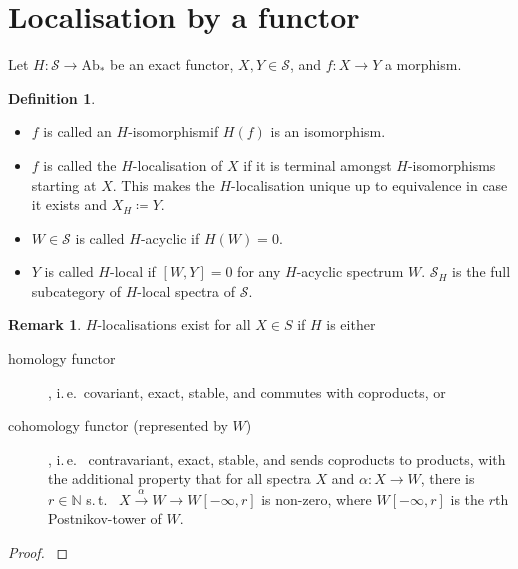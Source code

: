 \documentclass[english]{scrartcl}
\theoremstyle{definition}
\newtheorem*{Def}{Definition}
\newtheorem*{Rem}{Remark}
\theoremstyle{remark}
\newcommand*{\idest}{i.\,e.\ }
\newcommand*{\suchthat}{s.\,t.\ }
\newcommand*{\N}{\mathds{N}}
\newcommand*{\Spectra}{\mathcal{S}} %
\newcommand*{\graded}[1]{#1_*}  %
\newcommand*{\Abgr}{\graded{\text{Ab}}}  %
\newcommand*{\Hiso}{$H$-isomorphism}  %
\begin{document}
\section{Localisation by a functor}
Let $H\colon\Spectra\to\Abgr$ be an exact functor, $X,Y\in\Spectra$,
and $f\colon X\to Y$ a morphism.

\begin{Def}
  \begin{itemize}
  \item $f$ is called an \Hiso if $H(f)$ is an isomorphism.
  \item $f$ is called the $H$-localisation of $X$ if it is terminal
    amongst \Hiso s starting at $X$. This makes
    the $H$-localisation unique up to equivalence in case it exists
    and $X_H\coloneqq Y$.
  \item $W\in\Spectra$ is called $H$-acyclic if $H(W)=0$.
  \item $Y$ is called $H$-local if $[W, Y]=0$ for any $H$-acyclic spectrum $W$.
    $\Spectra_H$ is the full subcategory of $H$-local spectra of $\Spectra$.
  \end{itemize}
\end{Def}

\begin{Rem}
  $H$-localisations exist for all $X\in S$ if $H$ is either
  \begin{description}
  \item[homology functor], \idest covariant, exact, stable, and commutes with
    coproducts, or
  \item[cohomology functor (represented by $W$)], \idest
    contravariant, exact, stable, and sends coproducts to products,
    with the additional property that for all spectra $X$ and
    $\alpha\colon X\to W$, there is $r\in\N$ \suchthat
    $X\xrightarrow{\alpha} W\to W[-\infty, r]$ is non-zero, where
    $W[-\infty,r]$ is the $r$th Postnikov-tower of $W$.
  \end{description}
  \begin{proof}
    \cite[Prop. 7.6, and Thm. 7.7]{margolis}
  \end{proof}
\end{Rem}
\end{document}
